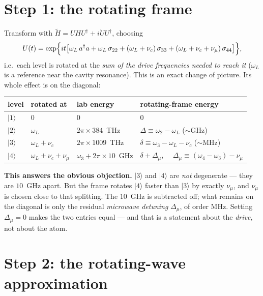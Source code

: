 \documentclass[11pt,a4paper]{article}
\newcommand{\ket}[1]{\lvert #1 \rangle}
\newcommand{\dg}{^{\dagger}}
\newcommand{\Dmu}{\Delta_{\mu}}
\begin{document}
\section{Step 1: the rotating frame}

Transform with $\tilde H = U H U\dg + i\dot U U\dg$, choosing
\begin{equation}
  U(t)=\exp\Bigl\{i t\bigl[\omega_L\, a\dg a + \omega_L\,\sigma_{22}
        + (\omega_L+\nu_c)\,\sigma_{33} + (\omega_L+\nu_c+\nu_\mu)\,\sigma_{44}\bigr]\Bigr\},
\end{equation}
i.e.\ each level is rotated at the \emph{sum of the drive frequencies needed to reach it}
($\omega_L$ is a reference near the cavity resonance). This is an exact change of picture. Its
whole effect is on the diagonal:

\begin{center}\small
\begin{tabular}{@{}llll@{}}
\toprule
level & rotated at & lab energy & rotating-frame energy \\
\midrule
$\ket{1}$ & $0$ & $0$ & $0$\\
$\ket{2}$ & $\omega_L$ & $2\pi\!\times\!384$~THz & $\Delta \equiv \omega_2-\omega_L$ \quad($\sim$GHz)\\
$\ket{3}$ & $\omega_L+\nu_c$ & $2\pi\!\times\!1009$~THz & $\delta \equiv \omega_3-\omega_L-\nu_c$ \quad($\sim$MHz)\\
$\ket{4}$ & $\omega_L+\nu_c+\nu_\mu$ & $\omega_3+2\pi\!\times\!10$~GHz &
   $\delta+\Dmu$, \ \ $\Dmu \equiv (\omega_4-\omega_3)-\nu_\mu$\\
\bottomrule
\end{tabular}
\end{center}

\begin{keybox}
\textbf{This answers the obvious objection.} $\ket{3}$ and $\ket{4}$ are \emph{not} degenerate
--- they are $10$~GHz apart. But the frame rotates $\ket{4}$ faster than $\ket{3}$ by exactly
$\nu_\mu$, and $\nu_\mu$ is chosen close to that splitting. The $10$~GHz is subtracted off;
what remains on the diagonal is only the residual \emph{microwave detuning} $\Dmu$, of order
MHz. Setting $\Dmu=0$ makes the two entries equal --- and that is a statement about the
\emph{drive}, not about the atom.
\end{keybox}

\section{Step 2: the rotating-wave approximation}
\end{document}

